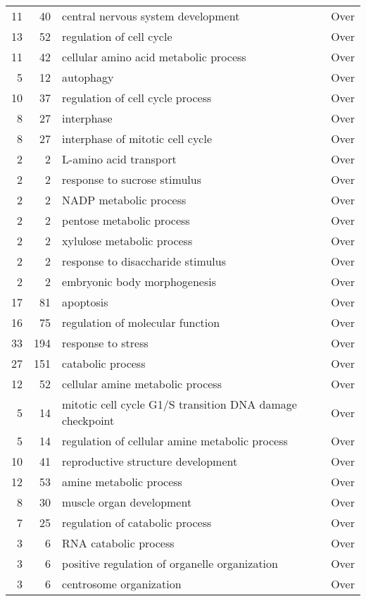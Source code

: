 \documentclass[10pt]{bmc_article}
\newenvironment{bmcformat}{\begin{raggedright}\baselineskip20pt\sloppy\setboolean{publ}{false}}{\end{raggedright}\baselineskip20pt\sloppy}
\begin{document}
\begin{bmcformat}
\begin{longtable}{rrll}
   11 &  40 & central nervous system development & Over \\ 
   13 &  52 & regulation of cell cycle & Over \\ 
   11 &  42 & cellular amino acid metabolic process & Over \\ 
    5 &  12 & autophagy & Over \\ 
   10 &  37 & regulation of cell cycle process & Over \\ 
    8 &  27 & interphase & Over \\ 
    8 &  27 & interphase of mitotic cell cycle & Over \\ 
    2 &   2 & L-amino acid transport & Over \\ 
    2 &   2 & response to sucrose stimulus & Over \\ 
    2 &   2 & NADP metabolic process & Over \\ 
    2 &   2 & pentose metabolic process & Over \\ 
    2 &   2 & xylulose metabolic process & Over \\ 
    2 &   2 & response to disaccharide stimulus & Over \\ 
    2 &   2 & embryonic body morphogenesis & Over \\ 
   17 &  81 & apoptosis & Over \\ 
   16 &  75 & regulation of molecular function & Over \\ 
   33 & 194 & response to stress & Over \\ 
   27 & 151 & catabolic process & Over \\ 
   12 &  52 & cellular amine metabolic process & Over \\ 
    5 &  14 & mitotic cell cycle G1/S transition DNA damage checkpoint & Over \\ 
    5 &  14 & regulation of cellular amine metabolic process & Over \\ 
   10 &  41 & reproductive structure development & Over \\ 
   12 &  53 & amine metabolic process & Over \\ 
    8 &  30 & muscle organ development & Over \\ 
    7 &  25 & regulation of catabolic process & Over \\ 
    3 &   6 & RNA catabolic process & Over \\ 
    3 &   6 & positive regulation of organelle organization & Over \\ 
    3 &   6 & centrosome organization & Over \\ 

\end{longtable}
\end{bmcformat}
\end{document}
